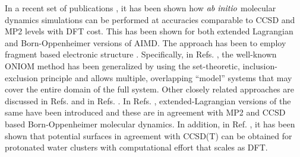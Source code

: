 In a recent set of publications \cite{fragAIMD,fragAIMD-elbo}, it
has been shown how $\it{ab~ initio}$ molecular dynamics simulations can be performed
at accuracies comparable to CCSD and MP2 levels with DFT cost. This has been
shown for both extended Lagrangian and
Born-Oppenheimer versions of AIMD. The approach has been to employ fragment
based electronic
structure \cite{morokuma-review1,Raghavachari-review,morokuma-review2,collins-review,
gordon-review,Weitao-DAC,oniom,oniomxs,EFP,FMO-feature-article,mfcc,
ee-mbe-water,ee-mbe,gebf,LS3DF,mta,ONIOM-XO,mim,mob,herbert-gmbe-1,
herbert-gmbe,Hirata-Fragments,Hirata-Fragments-2,gordon-fmo-dynamics2,
gordon-dynamics-1,cfm,Gao-XPol}. Specifically, in
Refs. \cite{fragAIMD,fragAIMD-elbo,fragAIMD-CC}, the well-known ONIOM
method \cite{oniom} has been generalized by using the set-theoretic,
inclusion-exclusion principle \cite{pie} and allows multiple, overlapping
``model'' systems that may cover the entire domain of the full
system. Other closely related approaches are discussed in Refs. \cite{mim,mta,ONIOM-XO}
and in Refs. \cite{fragAIMD,fragAIMD-elbo}. In Refs. \cite{fragAIMD-elbo,fragAIMD-CC},
extended-Lagrangian versions of the same have been introduced and these are in agreement
with MP2 and CCSD based Born-Oppenheimer molecular dynamics. In addition, in
Ref. \cite{fragAIMD,fragAIMD-elbo}, it has been shown that potential
surfaces in agreement with CCSD(T) can be obtained for protonated water
clusters with computational effort that scales as DFT.

